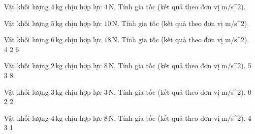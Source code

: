 \begin{bt}
Vật khối lượng $4\,\text{kg}$ chịu hợp lực $4\,\text{N}$. Tính gia tốc (kết quả theo đơn vị m/s^2).
\end{bt}

\begin{bt}
Vật khối lượng $5\,\text{kg}$ chịu hợp lực $10\,\text{N}$. Tính gia tốc (kết quả theo đơn vị m/s^2).
\end{bt}

\begin{ex}
Vật khối lượng $6\,\text{kg}$ chịu hợp lực $18\,\text{N}$. Tính gia tốc (kết quả theo đơn vị m/s^2).
\choice
{}
{4}
{2}
{6}
\end{ex}

\begin{ex}
Vật khối lượng $2\,\text{kg}$ chịu hợp lực $8\,\text{N}$. Tính gia tốc (kết quả theo đơn vị m/s^2).
\choice
{5}
{}
{3}
{8}
\end{ex}

\begin{ex}
Vật khối lượng $3\,\text{kg}$ chịu hợp lực $3\,\text{N}$. Tính gia tốc (kết quả theo đơn vị m/s^2).
\choice
{0}
{2}
{}
{2}
\end{ex}

\begin{ex}
Vật khối lượng $4\,\text{kg}$ chịu hợp lực $8\,\text{N}$. Tính gia tốc (kết quả theo đơn vị m/s^2).
\choice
{4}
{3}
{1}
{}
\end{ex}

